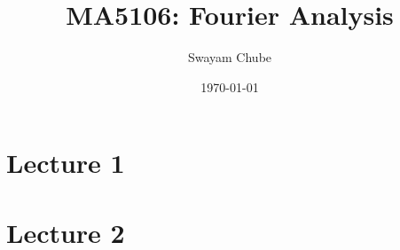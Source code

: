 \documentclass{report}
\title{MA5106: Fourier Analysis}
\author{Swayam Chube}
\date{\today}
\begin{document}
\maketitle

\tableofcontents

\chapter{Lecture 1}


\chapter{Lecture 2}

\end{document}

